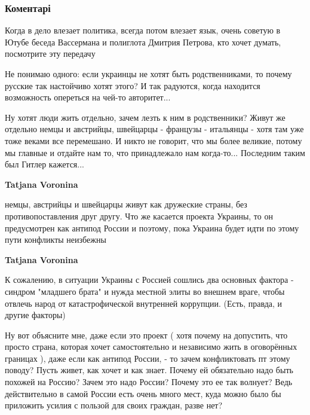  
 
 
 
 
\subsubsection{Коментарі}

\begin{itemize} %

Когда в дело влезает политика, всегда потом влезает язык, очень советую в Ютубе
беседа Вассермана и полиглота Дмитрия Петрова, кто хочет думать, посмотрите эту
передачу



Не понимаю одного: если украинцы не хотят быть родственниками, то почему
русские так настойчиво хотят этого? И так радуются, когда находится возможность
опереться на чей-то авторитет...

Ну хотят люди жить отдельно, зачем лезть к ним в родственники? Живут же
отдельно немцы и австрийцы, швейцарцы - французы - итальянцы - хотя там уже
тоже веками все перемешано. И никто не говорит, что мы более великие, потому мы
главные и отдайте нам то, что принадлежало нам когда-то... Последним таким был
Гитлер кажется...

\begin{itemize} %
\textbf{Tatjana Voronina} 

немцы, австрийцы и швейцарцы живут как дружеские страны, без противопоставления
друг другу. Что же касается проекта Украины, то он предусмотрен как антипод
России и поэтому, пока Украина будет идти по этому пути конфликты неизбежны


\textbf{Tatjana Voronina} 

К сожалению, в ситуации Украины с Россией сошлись два основных фактора -
синдром "младшего брата" и нужда местной элиты во внешнем враге, чтобы отвлечь
народ от катастрофической внутренней коррупции. (Есть, правда, и другие
факторы)



Ну вот объясните мне, даже если это проект ( хотя почему на допустить, что
просто страна, которая хочет самостоятельно и независимо жить в оговорённых
границах ), даже если как антипод России, - то зачем конфликтовать пт этому
поводу? Пусть живет, как хочет и как знает. Почему ей обязательно надо быть
похожей на Россию? Зачем это надо России? Почему это ее так волнует? Ведь
действительно в самой России есть очень много мест, куда можно было бы
приложить усилия с пользой для своих граждан, разве нет?


\end{itemize}
\end{itemize}
